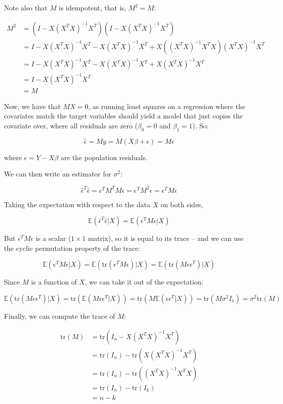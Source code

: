 Note also that \(M\) is idempotent, that is, \(M^{2} = M\):

\begin{align*}
M^{2} &= (I - X (X^T X)^{-1} X^T) (I - X (X^T X)^{-1} X^T) \\
&= I - X (X^T X)^{-1} X^T - X (X^T X)^{-1} X^T + X \left( (X^T X)^{-1} X^T X \right) (X^T X)^{-1} X^T \\
&= I - X (X^T X)^{-1} X^T - X (X^T X)^{-1} X^T + X (X^T X)^{-1} X^T \\
&= I - X (X^T X)^{-1} X^T \\
&= M
\end{align*}

Now, we have that \(MX = 0\), as running least squares on a regression
where the covariates match the target variables should yield a model
that just copies the covariate over, where all residuals are zero
(\(\beta_{0} = 0\) and \(\beta_{1} = 1\)). So:

\[\hat{\epsilon} = M y = M( X \beta + \epsilon) = M\epsilon\]

where \(\epsilon = Y - X\beta\) are the population residuals.

We can then write an estimator for \(\sigma^{2}\):

\[ \hat{\epsilon}^T \hat{\epsilon} = \epsilon^T M^T M \epsilon = \epsilon^T M^{2} \epsilon = \epsilon^T M \epsilon\]

Taking the expectation with respect to the data \(X\) on both sides,

\[\mathbb{E}(\hat{\epsilon}^T \hat{\epsilon} | X) = \mathbb{E}(\epsilon^T M \epsilon | X)\]

But \(\epsilon^T M \epsilon\) is a scalar (\(1 \times 1\) matrix), so it
is equal to its trace -- and we can use the cyclic permutation property
of the trace:

\[ \mathbb{E}(\epsilon^T M \epsilon | X) = \mathbb{E}(\text{tr}(\epsilon^T M \epsilon) | X) = \mathbb{E}(\text{tr}(M \epsilon \epsilon^T) | X)\]

Since \(M\) is a function of \(X\), we can take it out of the
expectation:

\[\mathbb{E}(\text{tr}(M \epsilon \epsilon^T) | X) = \text{tr}(\mathbb{E}(M \epsilon \epsilon^T | X))
= \text{tr}(M \mathbb{E}(\epsilon \epsilon^T | X))
= \text{tr}(M \sigma^{2} I_{1})
= \sigma^{2} \text{tr}(M)
\]

Finally, we can compute the trace of \(M\):

\begin{align*}
\text{tr}(M) &= \text{tr}(I_{n} - X(X^T X)^{-1}X^T)\\
&= \text{tr}(I_{n}) - \text{tr}(X(X^T X)^{-1}X^T) \\
&= \text{tr}(I_{n}) - \text{tr}((X^T X)^{-1}X^T X) \\
&= \text{tr}(I_{n}) - \text{tr}(I_{k})  \\
&= n - k
\end{align*}

